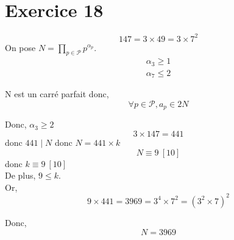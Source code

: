 \part{Exercice 18}

\[
147 = 3 \times 49 = 3 \times 7^2
\] 
On pose $N = \prod_{p \in \mathcal{P}} p^{\alpha_p}$.\\
\begin{align*}
	\alpha_3 \ge 1\\
	\alpha_7 \le 2
\end{align*}

N est un carré parfait donc, \[
\forall  p \in \mathcal{P}, a_{p} \in 2N
\] 

Donc, $\alpha_3 \ge 2$\\
\[
3 \times  147 = 441
\] donc $441  \mid  N$ donc $N = 441 \times k$
\[
N \equiv 9 ~[10]
\] donc $k \equiv 9 ~[10]$\\
De plus,  $9 \le k$.\\
Or, \[
9 \times  441 = 3969 = 3^4 \times 7^2 = \left(3^2\times 7\right)^2
\] 

Donc, \[
N = 3969
\] 
